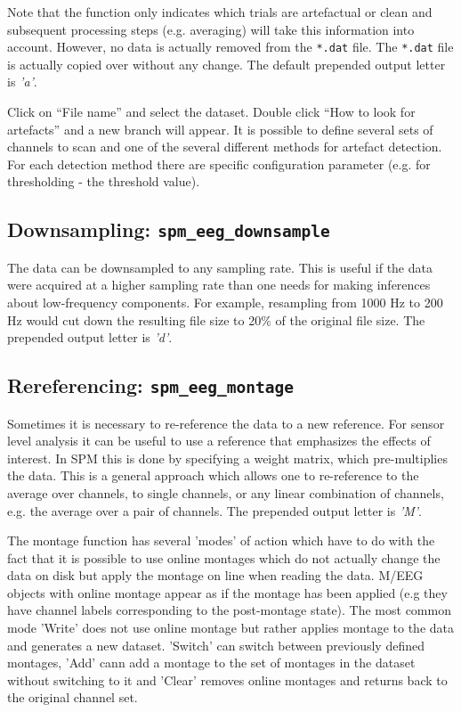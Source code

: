 Note that the function only indicates which trials are artefactual or clean and subsequent processing steps (e.g. averaging) will take this information into account. However, no data is actually removed from the \texttt{*.dat} file. The \texttt{*.dat} file is actually copied over without any change. The default prepended output letter is \textit{'a'}.

Click on ``File name'' and select the dataset.  Double click ``How to look for artefacts'' and a new branch will appear. It is possible to define several sets of channels to scan and one of the several different methods for artefact detection. For each detection method there are specific configuration parameter (e.g. for thresholding - the threshold value).

\subsection{Downsampling: \texttt{spm\_eeg\_downsample}}
The data can be downsampled to any sampling rate. This is useful if the data were acquired at a higher sampling rate than one needs for making inferences about low-frequency components. For example, resampling from 1000 Hz to 200 Hz would cut down the resulting file size to 20\% of the original file size. The prepended output letter is \textit{'d'}.

\subsection{Rereferencing: \texttt{spm\_eeg\_montage}}
Sometimes it is necessary to re-reference the data to a new reference.  For sensor level analysis it can be useful to use a reference that emphasizes the effects of interest. In SPM this is done by specifying a weight matrix, which pre-multiplies the data. This is a general approach which allows one to re-reference to the average over channels, to single channels, or any linear combination of channels, e.g. the average over a pair of channels. The prepended output letter is \textit{'M'}. 

The montage function has several 'modes' of action which have to do with the fact that it is possible to use online montages which do not actually change the data on disk but apply the montage on line when reading the data. M/EEG objects with online montage appear as if the montage has been applied (e.g they have channel labels corresponding to the post-montage state). The most common mode 'Write' does not use online montage but rather applies montage to the data and generates a new dataset. 'Switch' can switch between previously defined montages, 'Add' cann add a montage to the set of montages in the dataset without switching to it and 'Clear' removes online montages and returns back to the original channel set.

